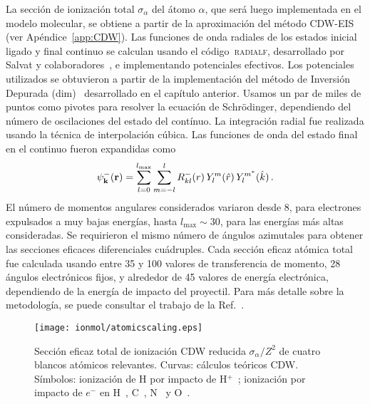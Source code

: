 La sección de ionización total $\sigma_{\alpha}$ del átomo $\alpha$, que 
será luego implementada en el modelo molecular, se obtiene a partir de la 
aproximación del método CDW-EIS (ver Apéndice~\ref{app:CDW}). Las 
funciones de onda radiales de los estados inicial ligado y final continuo 
se calculan usando el código~\textsc{radialf}, desarrollado por Salvat y 
colaboradores~\cite{salvat1995}, e implementando potenciales efectivos. 
Los potenciales utilizados se obtuvieron a partir de la implementación 
del método de Inversión Depurada (\acs{dim})~\cite{Mendez:16,Mendez:18} 
desarrollado en el capítulo anterior. Usamos un par de miles de puntos 
como pivotes para resolver la ecuación de Schr\"{o}dinger, dependiendo 
del número de oscilaciones del estado del contínuo. La integración radial 
fue realizada usando la técnica de interpolación cúbica. Las funciones de 
onda del estado final en el continuo fueron expandidas como
\begin{equation}
\psi_{\mbox{\scriptsize$\mathbf{k}$}}^-(\mathbf{r})=\sum_{l=0}^{l_{\max
}}\sum_{m=-l}^l R_{kl}^-(r)\,Y_l^m(\hat{r})\,Y_l^{m^*}
(\hat{k})\,.
\label{eq:contwave}
\end{equation}
El número de momentos angulares considerados variaron desde 8, para 
electrones expulsados a muy bajas energías, hasta $l_{\max}\sim 30$, para 
las energías más altas consideradas. Se requirieron el mismo número de 
ángulos azimutales para obtener las secciones eficaces diferenciales 
cuádruples. 
Cada sección eficaz atómica total fue calculada usando entre 35 y 100 
valores de transferencia de momento, 28 ángulos electrónicos fijos, y 
alrededor de 45 valores de energía electrónica, dependiendo de la energía 
de impacto del proyectil. Para más detalle sobre la metodología, se puede 
consultar el trabajo de la Ref.~\cite{Montanari:17-iongasesnobles}. 

\begin{figure}
\centering
\texttt{[image: ionmol/atomicscaling.eps]}
\caption[Sección eficaz total de ionización atómica CDW reducida.]
{Sección eficaz total de ionización CDW reducida $\sigma_{\alpha}/Z^2$ 
de cuatro blancos atómicos relevantes. Curvas: cálculos teóricos CDW. 
Símbolos: ionización de H por impacto de H$^+$~\cite{Shah:81}; ionización 
por impacto de $e^-$ en H~\cite{Shah:87}, C~\cite{Brook:78}, 
N~\cite{Brook:78} y O~\cite{Thompson:95}.}
\label{fig:atomscaling}
\end{figure} 

